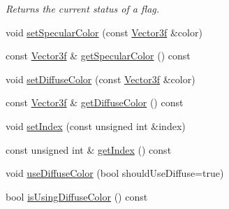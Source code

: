 \begin{DoxyCompactItemize}
\begin{DoxyCompactList}\small\item\em Returns the current status of a flag. \end{DoxyCompactList}\item 
void \hyperlink{classburn_1_1_material_ae50bc615e9bb17bc9eb232345fb1e776}{set\-Specular\-Color} (const \hyperlink{namespaceburn_afdd7cfb352b9612432faf6947b6fff74}{Vector3f} \&color)
\item 
const \hyperlink{namespaceburn_afdd7cfb352b9612432faf6947b6fff74}{Vector3f} \& \hyperlink{classburn_1_1_material_ab7d639a776c308b57eb0b3210b27449e}{get\-Specular\-Color} () const 
\item 
void \hyperlink{classburn_1_1_material_a0b50c4daafb286d54d5159bc93fc695c}{set\-Diffuse\-Color} (const \hyperlink{namespaceburn_afdd7cfb352b9612432faf6947b6fff74}{Vector3f} \&color)
\item 
const \hyperlink{namespaceburn_afdd7cfb352b9612432faf6947b6fff74}{Vector3f} \& \hyperlink{classburn_1_1_material_acc1501d3c24c0bf6c2f120d1e1a67c0f}{get\-Diffuse\-Color} () const 
\item 
void \hyperlink{classburn_1_1_material_a730e2d8f5d444f6ce45e1f25a4f424d6}{set\-Index} (const unsigned int \&index)
\item 
const unsigned int \& \hyperlink{classburn_1_1_material_a7e30e5e26a8a9648910ef17901452d20}{get\-Index} () const 
\item 
void \hyperlink{classburn_1_1_material_a016895c77f4fd7393ab263ac7455e5a2}{use\-Diffuse\-Color} (bool should\-Use\-Diffuse=true)
\item 
bool \hyperlink{classburn_1_1_material_a4f2d46a41409a068985c7377eeb1f3c4}{is\-Using\-Diffuse\-Color} () const 
\end{DoxyCompactItemize}


